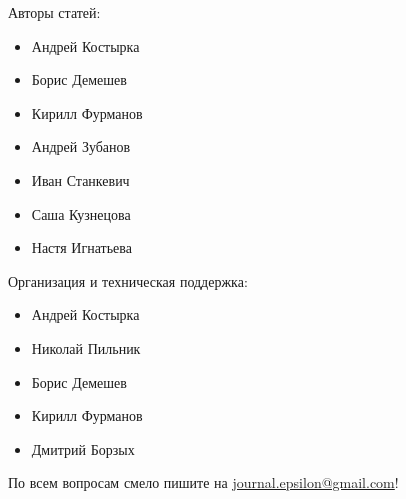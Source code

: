 \documentclass[12pt]{article}
\begin{document}
\pagestyle{empty}




Авторы статей:

\begin{itemize}
\item Андрей Костырка
\item Борис Демешев
\item Кирилл Фурманов
\item Андрей Зубанов
\item Иван Станкевич
\item Саша Кузнецова 
\item Настя Игнатьева
\end{itemize}


Организация и техническая поддержка:

\begin{itemize}
\item Андрей Костырка 
\item Николай Пильник 
\item Борис Демешев 
\item Кирилл Фурманов 
\item Дмитрий Борзых
\end{itemize}

По всем вопросам смело пишите на \href{mailto:journal.epsilon@gmail.com}{journal.epsilon@gmail.com}!
\end{document}
